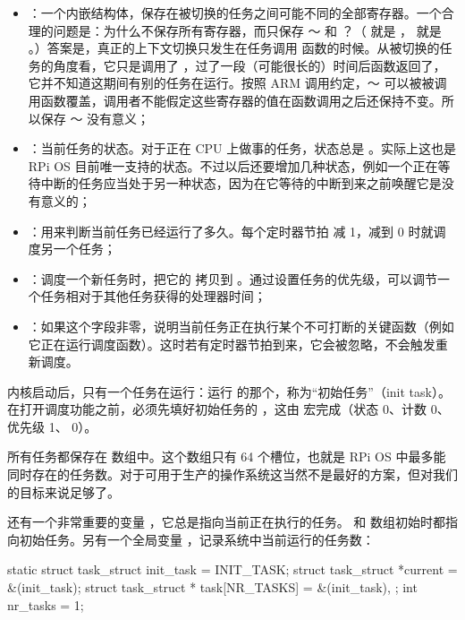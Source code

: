 \begin{itemize}
  \item {}：一个内嵌结构体，保存在被切换的任务之间可能不同的全部寄存器。一个合理的问题是：为什么不保存所有寄存器，而只保存 ～ 和 ？（ 就是 ， 就是 。）答案是，真正的上下文切换只发生在任务调用  函数的时候。从被切换的任务的角度看，它只是调用了 ，过了一段（可能很长的）时间后函数返回了，它并不知道这期间有别的任务在运行。按照 ARM 调用约定，～ 可以被被调用函数覆盖，调用者不能假定这些寄存器的值在函数调用之后还保持不变。所以保存 ～ 没有意义；
  \item {}：当前任务的状态。对于正在 CPU 上做事的任务，状态总是 。实际上这也是 RPi OS 目前唯一支持的状态。不过以后还要增加几种状态，例如一个正在等待中断的任务应当处于另一种状态，因为在它等待的中断到来之前唤醒它是没有意义的；
  \item {}：用来判断当前任务已经运行了多久。每个定时器节拍  减 1，减到 0 时就调度另一个任务；
  \item {}：调度一个新任务时，把它的  拷贝到 。通过设置任务的优先级，可以调节一个任务相对于其他任务获得的处理器时间；
  \item {}：如果这个字段非零，说明当前任务正在执行某个不可打断的关键函数（例如它正在运行调度函数）。这时若有定时器节拍到来，它会被忽略，不会触发重新调度。
\end{itemize}

内核启动后，只有一个任务在运行：运行  的那个，称为“初始任务”（init task）。在打开调度功能之前，必须先填好初始任务的 ，这由  宏完成（状态 0、计数 0、优先级 1、 0）。

所有任务都保存在  数组中。这个数组只有 64 个槽位，也就是 RPi OS 中最多能同时存在的任务数。对于可用于生产的操作系统这当然不是最好的方案，但对我们的目标来说足够了。

还有一个非常重要的变量 ，它总是指向当前正在执行的任务。 和  数组初始时都指向初始任务。另有一个全局变量 ，记录系统中当前运行的任务数：

\begin{ccode}
static struct task_struct init_task = INIT_TASK;
struct task_struct *current = &(init_task);
struct task_struct * task[NR_TASKS] = {&(init_task), };
int nr_tasks = 1;
\end{ccode}

